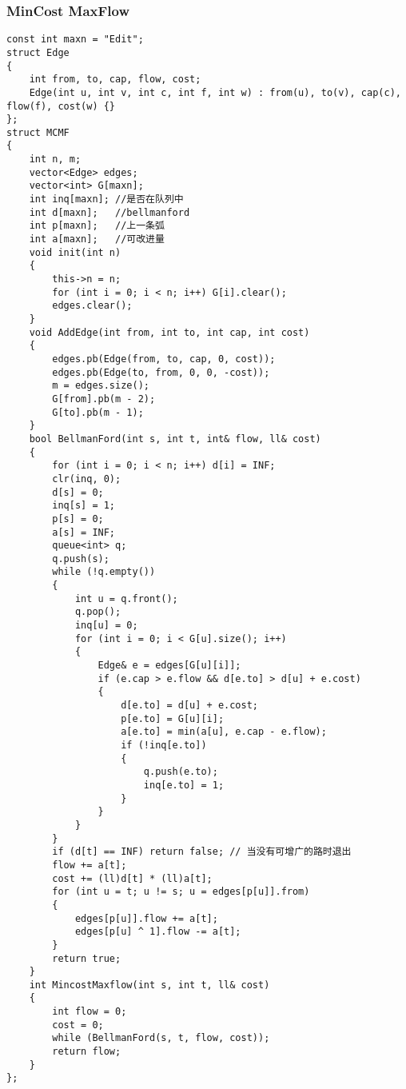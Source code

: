 \documentclass[twoside]{article}
\begin{document}
\subsubsection{MinCost MaxFlow}
\begin{lstlisting}
const int maxn = "Edit";
struct Edge
{
    int from, to, cap, flow, cost;
    Edge(int u, int v, int c, int f, int w) : from(u), to(v), cap(c), flow(f), cost(w) {}
};
struct MCMF
{
    int n, m;
    vector<Edge> edges;
    vector<int> G[maxn];
    int inq[maxn]; //是否在队列中
    int d[maxn];   //bellmanford
    int p[maxn];   //上一条弧
    int a[maxn];   //可改进量
    void init(int n)
    {
        this->n = n;
        for (int i = 0; i < n; i++) G[i].clear();
        edges.clear();
    }
    void AddEdge(int from, int to, int cap, int cost)
    {
        edges.pb(Edge(from, to, cap, 0, cost));
        edges.pb(Edge(to, from, 0, 0, -cost));
        m = edges.size();
        G[from].pb(m - 2);
        G[to].pb(m - 1);
    }
    bool BellmanFord(int s, int t, int& flow, ll& cost)
    {
        for (int i = 0; i < n; i++) d[i] = INF;
        clr(inq, 0);
        d[s] = 0;
        inq[s] = 1;
        p[s] = 0;
        a[s] = INF;
        queue<int> q;
        q.push(s);
        while (!q.empty())
        {
            int u = q.front();
            q.pop();
            inq[u] = 0;
            for (int i = 0; i < G[u].size(); i++)
            {
                Edge& e = edges[G[u][i]];
                if (e.cap > e.flow && d[e.to] > d[u] + e.cost)
                {
                    d[e.to] = d[u] + e.cost;
                    p[e.to] = G[u][i];
                    a[e.to] = min(a[u], e.cap - e.flow);
                    if (!inq[e.to])
                    {
                        q.push(e.to);
                        inq[e.to] = 1;
                    }
                }
            }
        }
        if (d[t] == INF) return false; // 当没有可增广的路时退出
        flow += a[t];
        cost += (ll)d[t] * (ll)a[t];
        for (int u = t; u != s; u = edges[p[u]].from)
        {
            edges[p[u]].flow += a[t];
            edges[p[u] ^ 1].flow -= a[t];
        }
        return true;
    }
    int MincostMaxflow(int s, int t, ll& cost)
    {
        int flow = 0;
        cost = 0;
        while (BellmanFord(s, t, flow, cost));
        return flow;
    }
};
\end{lstlisting}
\end{document}
